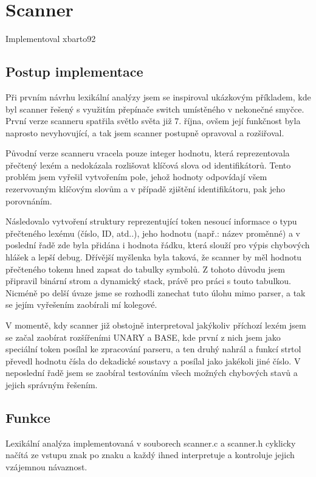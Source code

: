 \documentclass[11pt,a4paper]{article}
\begin{document}
\section{Scanner}
Implementoval xbarto92

	\subsection{Postup implementace}
	Při prvním návrhu lexikální analýzy jsem se inspiroval ukázkovým příkladem, kde byl scanner řešený s využitím přepínače switch umístěného v nekonečné smyčce. První verze scanneru spatřila světlo světa již 7. října, ovšem její funkčnost byla naprosto nevyhovující, a tak jsem scanner postupně opravoval a rozšiřoval.
	
	Původní verze scanneru vracela pouze integer hodnotu, která reprezentovala přečtený lexém a nedokázala rozlišovat klíčová slova od identifikátorů. Tento problém jsem vyřešil vytvořením pole, jehož hodnoty odpovídají všem rezervovaným klíčovým slovům a v případě zjištění identifikátoru, pak jeho porovnáním.
	
	Následovalo vytvoření struktury reprezentující token nesoucí informace o typu přečteného lexému (číslo, ID, atd..), jeho hodnotu (např.: název proměnné) a v poslední řadě zde byla přidána i hodnota řádku, která slouží pro výpis chybových hlášek a lepší debug. Dřívější myšlenka byla taková, že scanner by měl hodnotu přečteného tokenu hned zapsat do tabulky symbolů. Z tohoto důvodu jsem připravil binární strom a dynamický stack, právě pro práci s touto tabulkou. Nicméně po delší úvaze jsme se rozhodli zanechat tuto úlohu mimo parser, a tak se jejím vyřešením zaobírali mí kolegové.
	
	V momentě, kdy scanner již obstojně interpretoval jakýkoliv příchozí lexém jsem se začal zaobírat rozšířeními UNARY a BASE, kde první z nich jsem jako speciální token posílal ke zpracování parseru, a ten druhý nahrál a funkcí strtol převedl hodnotu čísla do dekadické soustavy a posílal jako jakékoli jiné číslo. V neposlední řadě jsem se zaobíral testováním všech možných chybových stavů a jejich správným řešením.

	\subsection{Funkce}
	Lexikální analýza implementovaná v souborech scanner.c a scanner.h cyklicky načítá ze vstupu znak po znaku a každý ihned interpretuje a kontroluje jejich vzájemnou návaznost.
	
\end{document}
